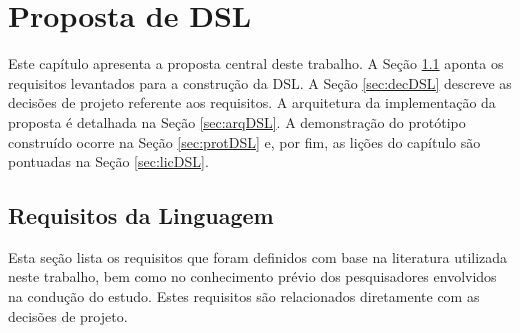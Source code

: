 \chapter{Proposta de DSL}\label{propostaDSL}

Este capítulo apresenta a proposta central deste trabalho. 
A Seção \ref{sec:reqDSL} aponta os requisitos levantados para a construção da \ac{DSL}. 
A Seção \ref{sec:decDSL} descreve as decisões de projeto referente aos requisitos. 
A arquitetura da implementação da proposta é detalhada na Seção \ref{sec:arqDSL}. 
A demonstração do protótipo construído ocorre na Seção \ref{sec:protDSL} e, por fim, as lições do capítulo são pontuadas na Seção \ref{sec:licDSL}.

\section{Requisitos da Linguagem} \label{sec:reqDSL}

Esta seção lista os requisitos que foram definidos com base na literatura utilizada neste trabalho, bem como no conhecimento prévio dos pesquisadores envolvidos na condução do estudo. 
Estes requisitos são relacionados diretamente com as decisões de projeto.


